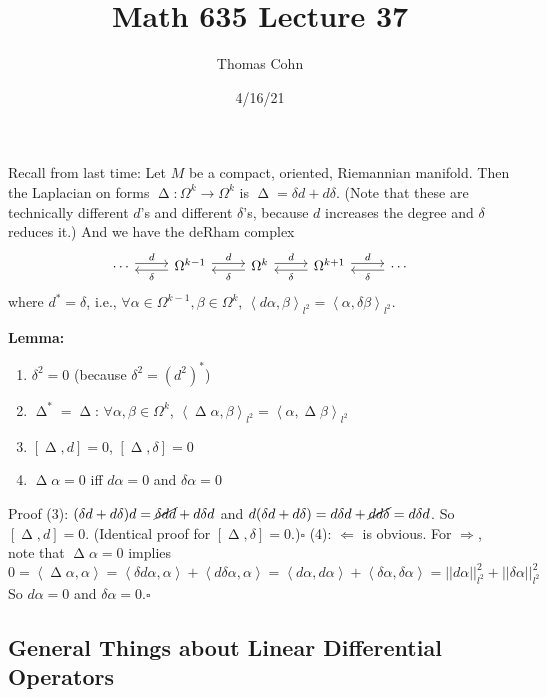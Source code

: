 \documentclass[10pt,letterpaper]{article}
\author{Thomas Cohn}
\title{Math 635 Lecture 37}
\date{4/16/21} %
\newcommand{\n}{\hfill\break}
\newcommand{\nn}{\vspace{0.5\baselineskip}\n}
\newcommand{\up}{\vspace{-\baselineskip}}
\newcommand{\hangblock}[2]{\par\noindent\settowidth{\hangindent}{\textbf{#1: }}\textbf{#1: }\nolinebreak#2}
\newcommand{\lemma}[1]{\hangblock{Lemma}{#1}}
\newcommand{\proven}{\;$\square$\n}
\newcommand{\comm}[1]{\left[#1\right]}
\DeclareMathOperator{\Laplacian}{\Delta}
\newcommand{\abs}[1]{\left|#1\right|}
\newcommand{\norm}[1]{\abs{\abs{#1}}}
\newcommand{\iprod}[1]{\left<#1\right>}
\begin{document}
\maketitle
\setlength\RaggedRightParindent{\parindent}
\RaggedRight

\par\noindent
Recall from last time: Let $M$ be a compact, oriented, Riemannian manifold. Then the Laplacian on forms $\Laplacian:\Omega^{k}\to\Omega^{k}$ is $\Laplacian=\delta{}d+d\delta$. (Note that these are technically different $d$'s and different $\delta$'s, because $d$ increases the degree and $\delta$ reduces it.) And we have the deRham complex
\[
	\begin{tikzcd}
		\cdots \arrow[r, shift left, "d"] & \Omega^{k-1} \arrow[l, shift left, "\delta"] \arrow[r, shift left, "d"] & \Omega^{k} \arrow[l, shift left, "\delta"] \arrow[r, shift left, "d"] & \Omega^{k+1} \arrow[l, shift left, "\delta"] \arrow[r, shift left, "d"] & \cdots \arrow[l, shift left, "\delta"]
	\end{tikzcd}
\]
where $d^{*}=\delta$, i.e., $\forall\alpha\in\Omega^{k-1},\beta\in\Omega^{k}$, $\iprod{d\alpha,\beta}_{l^{2}}=\iprod{\alpha,\delta\beta}_{l^{2}}$.\n

\lemma{
	\begin{enumerate}[leftmargin=4\parindent, label=(\arabic*)]
		\item $\delta^{2}=0$ (because $\delta^{2}=(d^{2})^{*}$)
		\item $\Laplacian^{*}=\Laplacian$: $\forall\alpha,\beta\in\Omega^{k}$, $\iprod{\Laplacian\alpha,\beta}_{l^{2}}=\iprod{\alpha,\Laplacian\beta}_{l^{2}}$
		\item $\comm{\Laplacian,d}=0$, $\comm{\Laplacian,\delta}=0$
		\item $\Laplacian\alpha=0$ iff $d\alpha=0$ and $\delta\alpha=0$
	\end{enumerate}\up\nn
	Proof (3): $(\delta{}d+d\delta)d=\cancel{\delta{}dd}+d\delta{}d$ and $d(\delta{}d+d\delta)=d\delta{}d+\cancel{dd\delta}=d\delta{}d$. So $\comm{\Laplacian,d}=0$. (Identical proof for $\comm{\Laplacian,\delta}=0$.)\proven
	(4): $\Leftarrow$ is obvious. For $\Rightarrow$, note that $\Laplacian\alpha=0$ implies
	\[
		0=\iprod{\Laplacian\alpha,\alpha}=\iprod{\delta{}d\alpha,\alpha}+\iprod{d\delta\alpha,\alpha}=\iprod{d\alpha,d\alpha}+\iprod{\delta\alpha,\delta\alpha}=\norm{d\alpha}_{l^{2}}^{2}+\norm{\delta\alpha}_{l^{2}}^{2}
	\]
	So $d\alpha=0$ and $\delta\alpha=0$.\proven
}

\subsection*{General Things about Linear Differential Operators}
\end{document}
